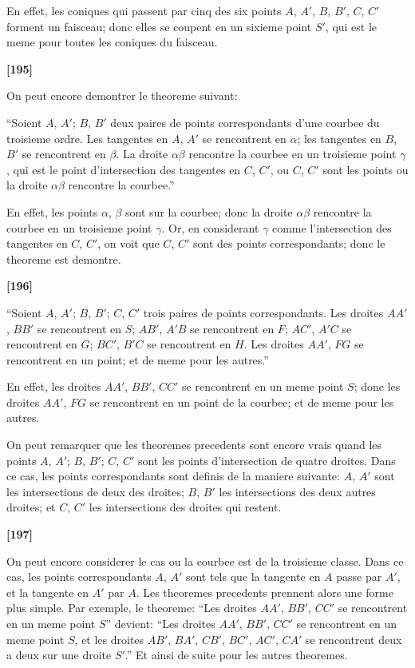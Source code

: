 \documentclass[11pt,a4paper]{article}
\begin{document}
En effet, les coniques qui passent par cinq des six points $A$, $A'$, $B$, $B'$, $C$, $C'$ forment
un faisceau; donc elles se coupent en un sixieme point $S'$, qui est le meme pour toutes
les coniques du faisceau.

\textbf{[195]}

On peut encore demontrer le theoreme suivant:

``Soient $A$, $A'$; $B$, $B'$ deux paires de points correspondants d'une courbee du troisieme
ordre. Les tangentes en $A$, $A'$ se rencontrent en $\alpha$; les tangentes en $B$, $B'$ se rencontrent
en $\beta$. La droite $\alpha\beta$ rencontre la courbee en un troisieme point $\gamma$, qui est le point
 d'intersection des tangentes en $C$, $C'$, ou $C$, $C'$ sont les points ou la droite $\alpha\beta$ rencontre
la courbee.''

En effet, les points $\alpha$, $\beta$ sont sur la courbee; donc la droite $\alpha\beta$ rencontre la courbee
en un troisieme point $\gamma$. Or, en considerant $\gamma$ comme l'intersection des tangentes en $C$, $C'$,
on voit que $C$, $C'$ sont des points correspondants; donc le theoreme est demontre.

\textbf{[196]}

``Soient $A$, $A'$; $B$, $B'$; $C$, $C'$ trois paires de points correspondants. Les droites
$AA'$, $BB'$ se rencontrent en $S$; $AB'$, $A'B$ se rencontrent en $F$; $AC'$, $A'C$ se rencontrent
en $G$; $BC'$, $B'C$ se rencontrent en $H$. Les droites $AA'$, $FG$ se rencontrent en un point;
et de meme pour les autres.''

En effet, les droites $AA'$, $BB'$, $CC'$ se rencontrent en un meme point $S$; donc les
droites $AA'$, $FG$ se rencontrent en un point de la courbee; et de meme pour les autres.

On peut remarquer que les theoremes precedents sont encore vrais quand les points
$A$, $A'$; $B$, $B'$; $C$, $C'$ sont les points d'intersection de quatre droites. Dans ce cas, les
points correspondants sont definis de la maniere suivante: $A$, $A'$ sont les intersections
de deux des droites; $B$, $B'$ les intersections des deux autres droites; et $C$, $C'$ les
intersections des droites qui restent.

\textbf{[197]}

On peut encore considerer le cas ou la courbee est de la troisieme classe. Dans
ce cas, les points correspondants $A$, $A'$ sont tels que la tangente en $A$ passe par $A'$,
et la tangente en $A'$ par $A$. Les theoremes precedents prennent alors une forme plus
simple. Par exemple, le theoreme: ``Les droites $AA'$, $BB'$, $CC'$ se rencontrent en un
meme point $S$'' devient: ``Les droites $AA'$, $BB'$, $CC'$ se rencontrent en un meme point
$S$, et les droites $AB'$, $BA'$, $CB'$, $BC'$, $AC'$, $CA'$ se rencontrent deux a deux sur une
droite $S'$.'' Et ainsi de suite pour les autres theoremes.
\end{document}
